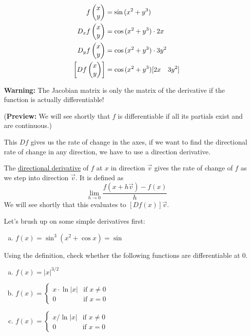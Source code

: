 \example
\begin{align*}
  f\begin{pmatrix} x \\ y \end{pmatrix} &= \sin{(x^2+y^3)} \\
  D_x f\begin{pmatrix} x \\ y \end{pmatrix} &= \cos{(x^2 + y^3)}\cdot 2x \\
  D_y f\begin{pmatrix} x \\ y \end{pmatrix} &= \cos{(x^2 + y^3)}\cdot 3y^2 \\
  \left[Df\begin{pmatrix} x \\ y \end{pmatrix}\right] &= \cos{(x^2 + y^3) [2x \quad 3y^2]}
\end{align*}

\textbf{Warning:} The Jacobian matrix is only the matrix of the derivative if the function is actually differentiable!

(\textbf{Preview:} We will see shortly that $f$ is differentiable if all its partials exist and are continuous.)

This $Df$ gives us the rate of change in the axes, if we want to find the directional rate of change in any direction, we have to use a direction derivative.

\begin{defn}
The \ul{directional derivative} of $f$ at $x$ in direction $\vec{v}$ gives the rate of change of $f$ as we step into direction $\vec{v}$. It is defined as
\[\lim_{h\to 0}\frac{f(x+h\vec{v})-f(x)}{h}\]
We will see shortly that this evaluates to $[Df(x)]\vec{v}$.
\end{defn}

Let's brush up on some simple derivatives first:
\begin{enumerate}[a.]
  \item $f(x) = \sin^3{(x^2 + \cos{x})} = \sin$
\end{enumerate}

 Using the definition, check whether the following functions are differentiable at 0.
\begin{enumerate}[a.]
  \item $f(x) = |x|^{3/2}$
  \item $\displaystyle f(x) = \begin{cases}x \cdot \ln{|x|} & \text{if } x \neq 0 \\ 0 & \text{if } x = 0 \end{cases}$ \\
  \item $\displaystyle f(x) = \begin{cases}x/ \ln{|x|} & \text{if } x \neq 0 \\ 0 & \text{if } x = 0\end{cases}$ \\
\end{enumerate}
